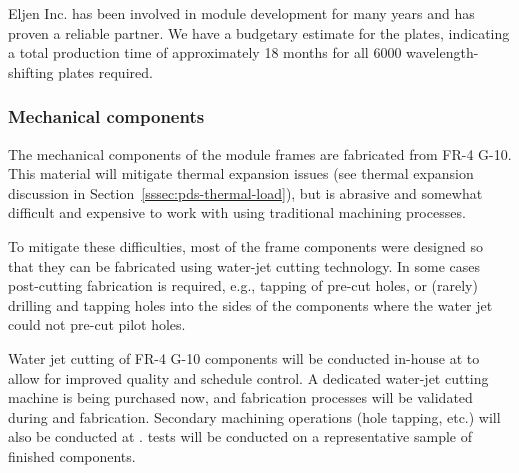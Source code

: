 
%

Eljen Inc. has been involved in  module development for many years and has proven a reliable partner.  We have a budgetary estimate for the plates, indicating a total production time of approximately \num{18} months for all \num{6000} wavelength-shifting plates required.

\subsubsection{Mechanical components}

The mechanical components of the  module frames are fabricated from
FR-4 G-10. This material will mitigate thermal expansion issues (see thermal expansion discussion in Section~\ref{sssec:pds-thermal-load}),
but is abrasive and somewhat difficult and expensive to work with using traditional machining processes.

To mitigate these difficulties, most of the  frame components were designed so that they can be fabricated using water-jet cutting technology.  In some cases post-cutting fabrication is required, e.g., tapping of pre-cut holes, or (rarely) drilling and tapping holes into the sides of the components where the water jet could not pre-cut pilot holes.

Water jet cutting of FR-4 G-10 components will be conducted in-house at  to allow for improved quality and schedule control.  A dedicated water-jet cutting machine is being purchased now, and fabrication processes will be validated during  and  fabrication.  Secondary machining operations (hole tapping, etc.) will also be conducted at .   tests will be conducted on a representative sample of finished components.

\label{sec:fdsp-pd-prod-pc}

